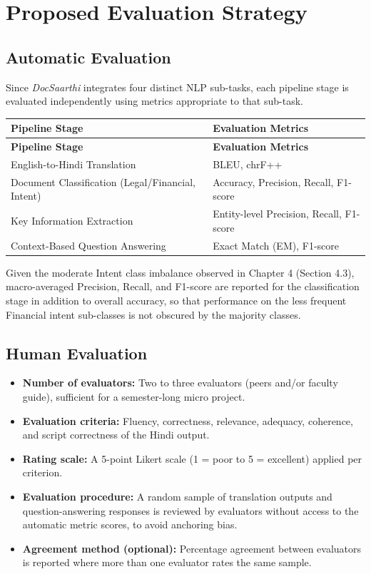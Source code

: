 \section{Proposed Evaluation Strategy}
\label{sec:eval_strategy}

\subsection{Automatic Evaluation}

Since \textit{DocSaarthi} integrates four distinct NLP sub-tasks, each pipeline stage is evaluated independently using metrics appropriate to that sub-task.

\begin{longtable}{|p{5.5cm}|p{7.5cm}|}
\hline
\textbf{Pipeline Stage} & \textbf{Evaluation Metrics} \\
\hline
\endfirsthead
\hline
\textbf{Pipeline Stage} & \textbf{Evaluation Metrics} \\
\hline
\endhead
English-to-Hindi Translation & BLEU, chrF++\\
\hline
Document Classification (Legal/Financial, Intent) & Accuracy, Precision, Recall, F1-score\\
\hline
Key Information Extraction & Entity-level Precision, Recall, F1-score\\
\hline
Context-Based Question Answering & Exact Match (EM), F1-score\\
\hline
\end{longtable}

Given the moderate Intent class imbalance observed in Chapter 4 (Section 4.3), macro-averaged Precision, Recall, and F1-score are reported for the classification stage in addition to overall accuracy, so that performance on the less frequent Financial intent sub-classes is not obscured by the majority classes.

\subsection{Human Evaluation}

\begin{itemize}
    \item \textbf{Number of evaluators:} Two to three evaluators (peers and/or faculty guide), sufficient for a semester-long micro project.
    \item \textbf{Evaluation criteria:} Fluency, correctness, relevance, adequacy, coherence, and script correctness of the Hindi output.
    \item \textbf{Rating scale:} A 5-point Likert scale (1 = poor to 5 = excellent) applied per criterion.
    \item \textbf{Evaluation procedure:} A random sample of translation outputs and question-answering responses is reviewed by evaluators without access to the automatic metric scores, to avoid anchoring bias.
    \item \textbf{Agreement method (optional):} Percentage agreement between evaluators is reported where more than one evaluator rates the same sample.
\end{itemize}

